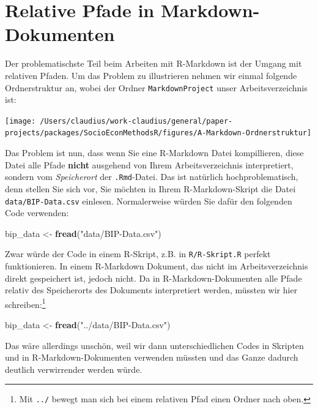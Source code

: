 \documentclass[]{tufte-book}
\newenvironment{Shaded}{}{}
\newcommand{\KeywordTok}[1]{\textcolor[rgb]{0.00,0.44,0.13}{\textbf{#1}}}
\newcommand{\StringTok}[1]{\textcolor[rgb]{0.25,0.44,0.63}{#1}}
\newcommand{\NormalTok}[1]{#1}
\begin{document}
\section{Relative Pfade in
Markdown-Dokumenten}\label{relative-pfade-in-markdown-dokumenten}

Der problematischste Teil beim Arbeiten mit R-Markdown ist der Umgang
mit relativen Pfaden. Um das Problem zu illustrieren nehmen wir einmal
folgende Ordnerstruktur an, wobei der Ordner \texttt{MarkdownProject}
unser Arbeitsverzeichnis ist:

\begin{center}\texttt{[image: /Users/claudius/work-claudius/general/paper-projects/packages/SocioEconMethodsR/figures/A-Markdown-Ordnerstruktur]} \end{center}

Das Problem ist nun, dass wenn Sie eine R-Markdown Datei kompillieren,
diese Datei alle Pfade \textbf{nicht} ausgehend von Ihrem
Arbeitsverzeichnis interpretiert, sondern vom \emph{Speicherort} der
\texttt{.Rmd}-Datei. Das ist natürlich hochproblematisch, denn stellen
Sie sich vor, Sie möchten in Ihrem R-Markdown-Skript die Datei
\texttt{data/BIP-Data.csv} einlesen. Normalerweise würden Sie dafür den
folgenden Code verwenden:

\begin{Shaded}
\begin{Highlighting}[]
\NormalTok{bip_data <-}\StringTok{ }\KeywordTok{fread}\NormalTok{(}\StringTok{"data/BIP-Data.csv"}\NormalTok{)}
\end{Highlighting}
\end{Shaded}

Zwar würde der Code in einem R-Skript, z.B. in \texttt{R/R-Skript.R}
perfekt funktionieren. In einem R-Markdown Dokument, das nicht im
Arbeitsverzeichnis direkt gespeichert ist, jedoch nicht. Da in
R-Markdown-Dokumenten alle Pfade relativ des Speicherorts des Dokuments
interpretiert werden, müssten wir hier schreiben:\footnote{Mit
  \texttt{../} bewegt man sich bei einem relativen Pfad einen Ordner
  nach oben.}

\begin{Shaded}
\begin{Highlighting}[]
\NormalTok{bip_data <-}\StringTok{ }\KeywordTok{fread}\NormalTok{(}\StringTok{"../data/BIP-Data.csv"}\NormalTok{)}
\end{Highlighting}
\end{Shaded}

Das wäre allerdings unschön, weil wir dann unterschiedlichen Codes in
Skripten und in R-Markdown-Dokumenten verwenden müssten und das Ganze
dadurch deutlich verwirrender werden würde.
\end{document}
